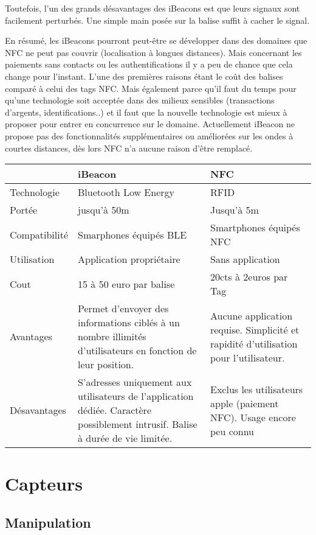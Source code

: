 \documentclass[francais,12pt]{article}
\begin{document}
		Toutefois, l'un des grands désavantages des iBeacons est que leurs signaux sont facilement perturbés. Une simple main posée sur la balise suffit à cacher le signal. 
	
		En résumé, les iBeacons pourront peut-être se développer dans des domaines que NFC ne peut pas couvrir (localisation à longues distances). Mais concernant les paiements sans contacts ou les authentifications il y a peu de chance que cela change pour l'instant.
		L’une des premières raisons étant le coût des balises comparé à celui des tags NFC. Mais également parce qu’il faut du temps pour qu’une technologie soit acceptée dans des milieux sensibles (transactions d’argents, identifications..) et il faut que la nouvelle technologie est mieux à proposer pour entrer en concurrence sur le domaine. Actuellement iBeacon ne propose pas des fonctionnalités supplémentaires ou améliorées sur les ondes à courtes distances, dès lors NFC n’a aucune raison d’être remplacé.
	
	
		\begin{tabular}{|l|p{6cm}|p{6cm}|}
		\hline 
		\rowcolor{lightgray}& iBeacon & NFC \\ 
		\hline 
		Technologie & Bluetooth Low Energy  & RFID  \\ 
		\hline 
		Portée & jusqu'à 50m  & Jusqu'à 5m \\ 
		\hline 
		Compatibilité & Smarphones équipés BLE  & Smartphones équipés NFC  \\ 
		\hline 
		Utilisation & Application propriétaire & Sans application \\ 
		\hline 
		Cout &  15 à 50 euro par balise & 20cts à 2euros par Tag \\ 
		\hline 
		Avantages & Permet d'envoyer des informations ciblés à un nombre illimités d'utilisateurs en fonction de leur position.  & Aucune application requise. Simplicité et rapidité d'utilisation pour l'utilisateur. \\ 
		\hline 
		Désavantages & S'adresses uniquement aux utilisateurs de l'application dédiée. Caractère possiblement intrusif. Balise à durée de vie limitée. & Exclus les utilisateurs apple (paiement NFC). Usage encore peu connu \\ 
		\hline 
	\end{tabular} 
	
	\section*{Capteurs}
	\subsection*{Manipulation}
\end{document}
